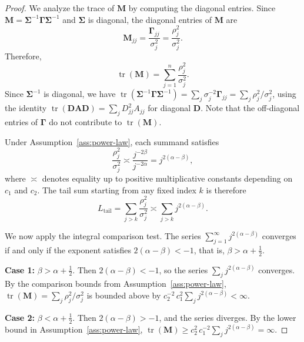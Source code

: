 \documentclass[12pt]{amsart}
\theoremstyle{definition}
\theoremstyle{remark}
\DeclareMathOperator{\tr}{tr}
\newcommand{\bM}{\mathbf{M}}
\begin{document}
\begin{proof}
We analyze the trace of $\bM$ by computing the diagonal entries.  Since
$\bM = \boldsymbol{\Sigma}^{-1}\boldsymbol{\Gamma}\boldsymbol{\Sigma}^{-1}$
and $\boldsymbol{\Sigma}$ is diagonal, the diagonal entries of $\bM$ are
\begin{equation}\label{eq:M-diag}
  \bM_{jj} = \frac{\boldsymbol{\Gamma}_{jj}}{\sigma_{j}^{2}}
            = \frac{\rho_{j}^{2}}{\sigma_{j}^{2}}.
\end{equation}
Therefore,
\begin{equation}\label{eq:trM}
  \tr(\bM) = \sum_{j=1}^{n} \frac{\rho_{j}^{2}}{\sigma_{j}^{2}}.
\end{equation}
Since $\boldsymbol{\Sigma}^{-1}$ is diagonal, we have
$\tr(\boldsymbol{\Sigma}^{-1}\boldsymbol{\Gamma}\boldsymbol{\Sigma}^{-1})
= \sum_{j} \sigma_{j}^{-2}\boldsymbol{\Gamma}_{jj}
= \sum_{j} \rho_{j}^{2}/\sigma_{j}^{2}$,
using the identity $\tr(\mathbf{D}\mathbf{A}\mathbf{D}) = \sum_{j} D_{jj}^{2} A_{jj}$ for diagonal $\mathbf{D}$.  Note that the off-diagonal entries of $\boldsymbol{\Gamma}$ do not contribute to $\tr(\bM)$.

Under Assumption~\ref{ass:power-law}, each summand satisfies
\begin{equation}\label{eq:summand}
  \frac{\rho_{j}^{2}}{\sigma_{j}^{2}}
  \asymp \frac{j^{-2\beta}}{j^{-2\alpha}}
  = j^{2(\alpha - \beta)},
\end{equation}
where $\asymp$ denotes equality up to positive multiplicative constants
depending on $c_{1}$ and $c_{2}$.  The tail sum starting from any fixed index
$k$ is therefore
\begin{equation}\label{eq:tail}
  L_{\mathrm{tail}} = \sum_{j > k} \frac{\rho_{j}^{2}}{\sigma_{j}^{2}}
  \asymp \sum_{j > k} j^{2(\alpha - \beta)}.
\end{equation}

We now apply the integral comparison test.  The series
$\sum_{j=1}^{\infty} j^{2(\alpha - \beta)}$ converges if and only if the
exponent satisfies $2(\alpha - \beta) < -1$, that is, $\beta > \alpha + \tfrac{1}{2}$.

\medskip
\noindent\textbf{Case 1:} $\beta > \alpha + \tfrac{1}{2}$.  Then
$2(\alpha - \beta) < -1$, so the series $\sum_{j} j^{2(\alpha-\beta)}$
converges.  By the comparison bounds from Assumption~\ref{ass:power-law},
$\tr(\bM) = \sum_{j} \rho_{j}^{2}/\sigma_{j}^{2}$ is bounded above by
$c_{2}^{-2}\,c_{1}^{2} \sum_{j} j^{2(\alpha - \beta)} < \infty$.

\medskip
\noindent\textbf{Case 2:} $\beta < \alpha + \tfrac{1}{2}$.  Then
$2(\alpha - \beta) > -1$, and the series diverges.  By the lower bound in
Assumption~\ref{ass:power-law},
$\tr(\bM) \geq c_{2}^{2}\,c_{1}^{-2} \sum_{j} j^{2(\alpha-\beta)} = \infty$.


\end{proof}
\end{document}

